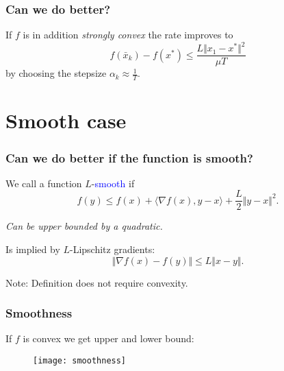 \documentclass{beamer}
\begin{document}
\label{sec:}
\begin{frame}
  \frametitle{Can we do better?}
  If $f$ is in addition \emph{strongly convex} the rate improves to
  \begin{equation}
    f(\bar{x}_k) - f(x^*) \le \frac{L \Vert x_1-x^* \Vert^2}{\mu T}
  \end{equation}
  by choosing the stepsize $\alpha_k \approx \frac{1}{T}$.
\end{frame}


\section{Smooth case}%
\label{sec:}

\begin{frame}
  \frametitle{Can we do better if the function is smooth?}
  \begin{definition}
    We call a function $L$-\textcolor{blue}{smooth} if
    \begin{equation}
      f(y) \le f(x) + \langle \nabla f(x), y-x \rangle + \frac{L}{2} \Vert y-x \Vert^2.
    \end{equation}
  \end{definition}
  \begin{center}
    \textit{Can be upper bounded by a quadratic.}
  \end{center}
  \begin{lemma}%
    Is implied by $L$-Lipschitz gradients:
    \begin{equation}
      \Vert \nabla f(x)-f(y) \Vert \le L \Vert x-y \Vert.
    \end{equation}
  \end{lemma}
  Note: Definition does not require convexity.
\end{frame}


\begin{frame}
  \frametitle{Smoothness}
  If $f$ is convex we get upper and lower bound:

  \begin{figure}[ht]
    \centering
    \texttt{[image: smoothness]}
  \end{figure}
\end{frame}
\end{document}
